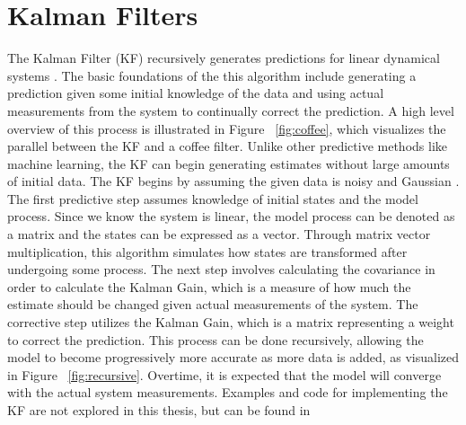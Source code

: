 \chapter{Kalman Filters}
\label{Kalman Filters}


The Kalman Filter (KF) recursively generates predictions for linear dynamical systems \cite{inbook}. The basic foundations of the this algorithm include generating a prediction given some initial knowledge of the data and using actual measurements from the system to continually correct the prediction. A high level overview of this process is illustrated in Figure ~\ref{fig:coffee}, which visualizes the parallel between the KF and a coffee filter. 	Unlike other predictive methods like machine learning, the KF can begin generating estimates without large amounts of initial data. The KF begins by assuming the given data is noisy and Gaussian \cite{inproceedings, article7}. The first predictive step assumes knowledge of initial states and the model process. Since we know the system is linear, the model process can be denoted as a matrix and the states can be expressed as a vector. Through matrix vector multiplication, this algorithm simulates how states are transformed after undergoing some process. The next step involves calculating the covariance in order to calculate the Kalman Gain, which is a measure of how much the estimate should be changed given actual measurements of the system. The corrective step utilizes the Kalman Gain, which is a matrix representing a weight to correct the prediction. This process can be done recursively, allowing the model to become progressively more accurate as more data is added, as visualized in Figure ~\ref{fig:recursive}. Overtime, it is expected that the model will converge with the actual system measurements. Examples and code for implementing the KF are not explored in this thesis, but can be found in \cite{article7}
\\  \\

